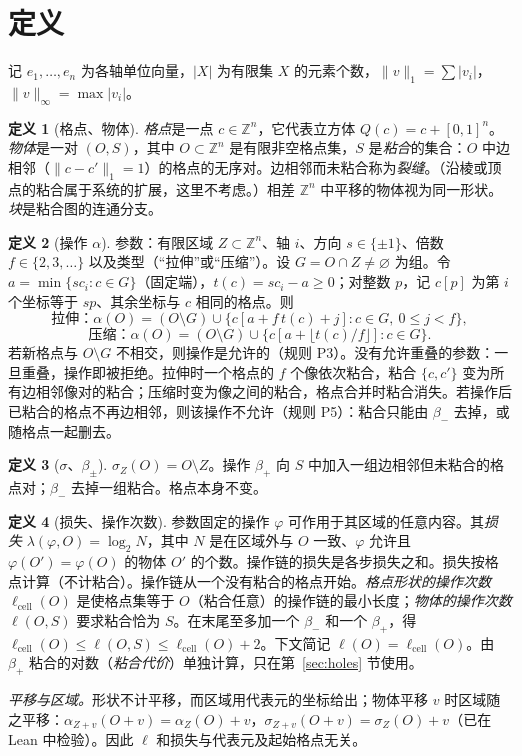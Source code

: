 \documentclass[11pt,a4paper]{article}
\theoremstyle{plain}
\theoremstyle{definition}
\newtheorem{definition}{定义}
\theoremstyle{remark}
\newcommand{\Z}{\mathbb{Z}}
\newcommand{\lo}{\lambda}
\begin{document}
\section{定义}\label{sec:def}

记 $e_1,\dots,e_n$ 为各轴单位向量，$|X|$ 为有限集 $X$ 的元素个数，$\|v\|_1=\sum|v_i|$，$\|v\|_\infty=\max|v_i|$。

\begin{definition}[格点、物体]
\emph{格点}是一点 $c\in\Z^n$，它代表立方体 $Q(c)=c+[0,1]^n$。\emph{物体}是一对 $(O,S)$，其中 $O\subset\Z^n$ 是有限非空格点集，$S$ 是\emph{粘合}的集合：$O$ 中边相邻（$\|c-c'\|_1=1$）的格点的无序对。边相邻而未粘合称为\emph{裂缝}。（沿棱或顶点的粘合属于系统的扩展，这里不考虑。）相差 $\Z^n$ 中平移的物体视为同一形状。\emph{块}是粘合图的连通分支。
\end{definition}

\begin{definition}[操作 $\alpha$]
参数：有限区域 $Z\subset\Z^n$、轴 $i$、方向 $s\in\{\pm1\}$、倍数 $f\in\{2,3,\dots\}$ 以及类型（“拉伸”或“压缩”）。设 $G=O\cap Z\neq\varnothing$ 为组。令 $a=\min\{s c_i: c\in G\}$（固定端），$t(c)=s c_i-a\ge0$；对整数 $p$，记 $c[p]$ 为第 $i$ 个坐标等于 $sp$、其余坐标与 $c$ 相同的格点。则
\[
\text{拉伸：} \alpha(O)=(O\setminus G)\cup\{c[a+f\,t(c)+j]: c\in G,\ 0\le j<f\},
\]
\[
\text{压缩：} \alpha(O)=(O\setminus G)\cup\{c[a+\lfloor t(c)/f\rfloor]: c\in G\}.
\]
若新格点与 $O\setminus G$ 不相交，则操作是允许的（规则 P3）。没有允许重叠的参数：一旦重叠，操作即被拒绝。拉伸时一个格点的 $f$ 个像依次粘合，粘合 $\{c,c'\}$ 变为所有边相邻像对的粘合；压缩时变为像之间的粘合，格点合并时粘合消失。若操作后已粘合的格点不再边相邻，则该操作不允许（规则 P5）：粘合只能由 $\beta_-$ 去掉，或随格点一起删去。
\end{definition}

\begin{definition}[$\sigma$、$\beta_\pm$]
$\sigma_Z(O)=O\setminus Z$。操作 $\beta_+$ 向 $S$ 中加入一组边相邻但未粘合的格点对；$\beta_-$ 去掉一组粘合。格点本身不变。
\end{definition}

\begin{definition}[损失、操作次数]
参数固定的操作 $\varphi$ 可作用于其区域的任意内容。其\emph{损失} $\lo(\varphi,O)=\log_2 N$，其中 $N$ 是在区域外与 $O$ 一致、$\varphi$ 允许且 $\varphi(O')=\varphi(O)$ 的物体 $O'$ 的个数。操作链的损失是各步损失之和。损失按格点计算（不计粘合）。操作链从一个没有粘合的格点开始。\emph{格点形状的操作次数} $\ell_{\mathrm{cell}}(O)$ 是使格点集等于 $O$（粘合任意）的操作链的最小长度；\emph{物体的操作次数} $\ell(O,S)$ 要求粘合恰为 $S$。在末尾至多加一个 $\beta_-$ 和一个 $\beta_+$，得 $\ell_{\mathrm{cell}}(O)\le\ell(O,S)\le\ell_{\mathrm{cell}}(O)+2$。下文简记 $\ell(O)=\ell_{\mathrm{cell}}(O)$。由 $\beta_+$ 粘合的对数（\emph{粘合代价}）单独计算，只在第~\ref{sec:holes} 节使用。

\emph{平移与区域。}形状不计平移，而区域用代表元的坐标给出；物体平移 $v$ 时区域随之平移：$\alpha_{Z+v}(O+v)=\alpha_Z(O)+v$，$\sigma_{Z+v}(O+v)=\sigma_Z(O)+v$（已在 Lean 中检验）。因此 $\ell$ 和损失与代表元及起始格点无关。
\end{definition}
\end{document}
